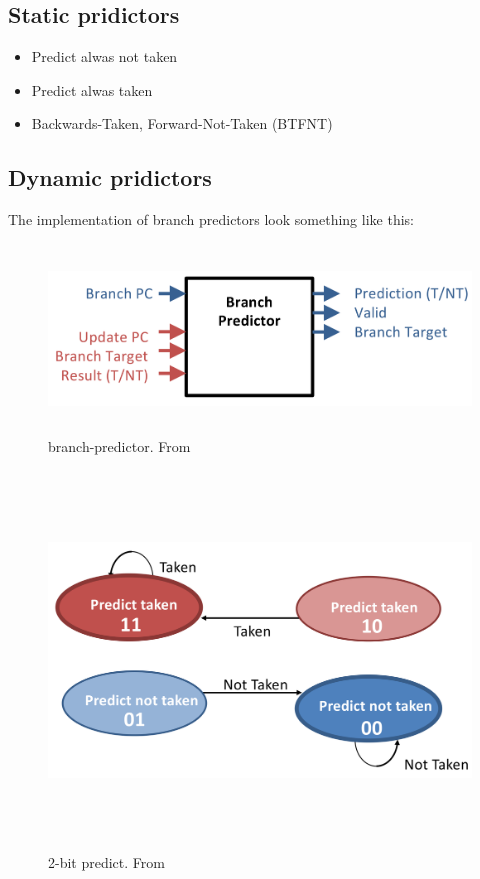 \subsection{Static pridictors}
\begin{itemize}
\item  Predict alwas not taken
\item  Predict alwas taken
\item  Backwards-Taken, Forward-Not-Taken (BTFNT)
\end{itemize}


\subsection{Dynamic pridictors}

The implementation of branch predictors look something like this:
\begin{figure}[h]
    \vspace{10mm}
    \centering
    \includegraphics[width=16cm, height=5cm]{image/branch-predictor.png} 
    \caption{branch-predictor. From \cite{}}
\end{figure}


\begin{figure}[h]
    \vspace{10mm}
    \centering
    \includegraphics[width=16cm, height=10cm]{image/2-bit-predict.png} 
    \caption{2-bit predict. From \cite{}}
\end{figure}


